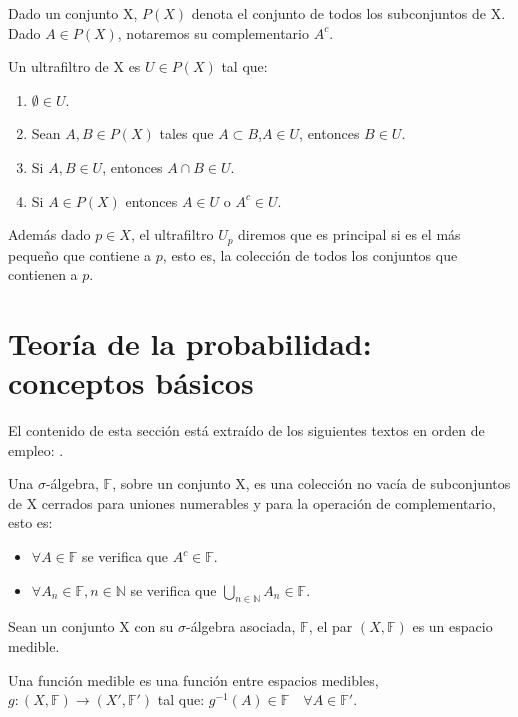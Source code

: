\documentclass[../proyecto.tex]{memoir}
\begin{document}
Dado un conjunto X, $P(X)$ denota el conjunto de todos los subconjuntos de X. Dado $A \in P(X)$, notaremos su complementario $A^{c}$. 
\begin{defi}
Un ultrafiltro de X es $U \in P(X)$ tal que:

\begin{enumerate}
\item $\emptyset \in U$.
\item Sean $A,B \in P(X)$ tales que $A \subset B$,$ A \in U$, entonces $B \in U$.
\item Si $A,B \in U$, entonces $A \cap B \in U$.
\item Si $A \in P(X)$ entonces $A \in U$ o $ A^{c} \in U$.
\end{enumerate}

Además dado $p \in X$, el ultrafiltro $U_{p}$ diremos que es principal si es el más pequeño que contiene a $p$, esto es, la colección de todos los conjuntos que contienen a $p$.
\end{defi}

\section{Teoría de la probabilidad: conceptos básicos}

El contenido de esta sección está extraído de los siguientes textos en orden de empleo: \cite{elLibro, grandesNumeros, loeve}. 

\begin{defi}
Una $\sigma$-álgebra, $\mathds{F}$, sobre un conjunto X, es una colección no vacía de subconjuntos de X cerrados para uniones numerables y para la operación de complementario, esto es:
\begin{itemize}
\item $\forall A \in \mathds{F}$ se verifica que $A^{c} \in \mathds{F}$.
\item $ \forall A_{n} \in \mathds{F}, n \in \mathds{N} $ se verifica que $\bigcup _{n \in \mathds{N}} A_{n} \in \mathds{F}$.
\end{itemize}
\end{defi}

\begin{defi}
Sean un conjunto X con su $\sigma$-álgebra asociada, $\mathds{F}$, el par $(X, \mathds{F})$ es un espacio medible. 
\end{defi}

\begin{defi}
Una función medible es una función entre espacios medibles, $g:  (X,\mathds{F}) \rightarrow (X',\mathds{F}')$ tal que: $g^{-1}(A) \in \mathds{F} \quad \forall A \in \mathds{F}'$.
\end{defi}
\end{document}
